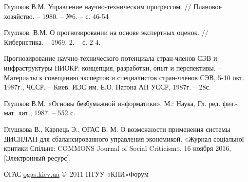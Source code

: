 \begin{thebibliography}{99}

 
Глушков В.М. Управление научно-техническим прогрессом. // Плановое хозяйство. –
1980. – №6. – с. 46-54

Глушков. В.М. О прогнозировании на основе экспертных оценок. // Кибернетика. –
1969. 2. – с. 2-4.

Прогнозирование научно-технического потенциала стран-членов СЭВ и инфраструктуры
НИОКР: концепция, разработки, опыт и перспективы. – Материалы к совещанию
экспертов и специалистов стран-членов СЭВ, 5-10 окт. 1987г., ЧССР. – Киев: ИЭС
им. Е.О. Патона АН УССР, 1987г. – 28с.

Глушков В.М. «Основы безбумажной информатики», М.: Наука, Гл. ред. физ.-мат.
лит., 1987. – 552 с.

Глушкова В., Карпець Э., ОГАС В. М. О возможности применения системы ДИСПЛАН для
сбалансированного управления экономикой. «Журнал соціальної критики Спільне:
COMMONS Journal of Social Criticism», 16 ноября 2016, [Электронный ресурс].

\end{thebibliography}

ОГАС
\url{ogas.kiev.ua} \copyright\ 2011
НТУУ «КПИ»Форум

